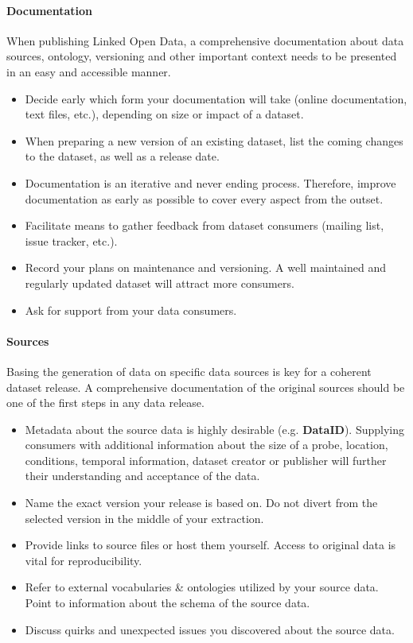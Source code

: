 \documentclass[a4paper,english,twoside,BCOR1.5cm,headsepline,DIV12,appendixprefix,final,12pt]{scrbook}
\newcommand{\dataid}{{\ttfamily\bfseries DataID}\xspace}
\begin{document}
\paragraph{Documentation}
When publishing Linked Open Data, a comprehensive documentation about data sources, ontology, versioning and other important context needs to be presented in an easy and accessible manner. 
\begin{itemize}
\itemsep0em 
\item Decide early which form your documentation will take (online documentation, text files, etc.), depending on size or impact of a dataset. 
\item When preparing a new version of an existing dataset, list the coming changes to the dataset, as well as a release date.
\item Documentation is an iterative and never ending process. Therefore, improve documentation as early as possible to cover every aspect from the outset.
\item Facilitate means to gather feedback from dataset consumers (mailing list, issue tracker, etc.).%
\item Record your plans on maintenance and versioning. A well maintained and regularly updated dataset will attract more consumers.%
\item Ask for support from your data consumers.
\end{itemize}

\vspace{-1.5em}
\paragraph{Sources}
Basing the generation of data on specific data sources is key for a coherent dataset release. 
A comprehensive documentation of the original sources should be one of the first steps in any data release.
\begin{itemize}
\itemsep0em 
\item Metadata about the source data is highly desirable (e.g. \dataid). Supplying consumers with additional information about the size of a probe, location, conditions, temporal information, dataset creator or publisher will further their understanding and acceptance of the data.
\item Name the exact version your release is based on. Do not divert from the selected version in the middle of your extraction.
\item Provide links to source files or host them yourself. Access to original data is vital for reproducibility.
\item Refer to external vocabularies \& ontologies utilized by your source data. Point to information about the schema of the source data.
\item Discuss quirks and unexpected issues you discovered about the source data.
\end{itemize}
\end{document}

